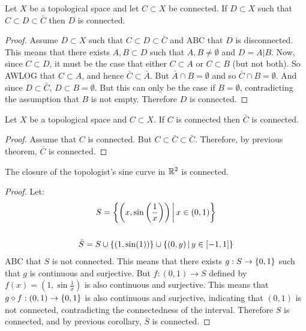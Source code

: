 \documentclass[letterpaper,12pt,fleqn]{article}
\begin{document}
\begin{theorem}[8.6]
  Let \(X\) be a topological space and let \(C\subset X\) be connected.  If \(D\subset X\) such that
  \(C\subset D\subset\bar{C}\) then \(D\) is connected.
\end{theorem}

\begin{proof}
  Assume \(D\subset X\) such that \(C\subset D\subset\bar{C}\) and ABC that \(D\) is disconnected.  This means that
  there exists \(A,B\subset D\) such that \(A,B\ne\emptyset\) and \(D=A|B\).  Now, since \(C\subset D\), it must be
  the case that either \(C\subset A\) or \(C\subset B\) (but not both).  So AWLOG that \(C\subset A\), and hence
  \(\bar{C}\subset\bar{A}\).  But \(\bar{A}\cap B=\emptyset\) and so \(\bar{C}\cap B=\emptyset\).  And since
  \(D\subset\bar{C}\), \(D\subset B=\emptyset\).  But this can only be the case if \(B=\emptyset\), contradicting
  the assumption that \(B\) is not empty.  Therefore \(D\) is connected.
\end{proof}

\begin{corollary}
  Let \(X\) be a topological space and \(C\subset X\).  If \(C\) is connected then \(\bar{C}\) is connected.
\end{corollary}

\begin{proof}
  Assume that \(C\) is connected.  But \(C\subset\bar{C}\subset\bar{C}\).  Therefore, by previous theorem,
  \(\bar{C}\) is connected.
\end{proof}

\begin{theorem}[Exercise 8.7]
  The closure of the topologist's sine curve in \(\mathbb{R}^2\) is connected.
\end{theorem}

\begin{proof}
  Let:
  \begin{gather*}
    S=\left\{{\left(x,\sin\left(\frac{1}{x}\right)\right)}\,\middle|\,{x\in(0,1)}\right\} \\
    \\
    \bar{S}=S\cup\{(1,\sin(1))\}\cup\left\{{(0,y)}\,\middle|\,{y\in[-1,1]}\right\}
  \end{gather*}
  ABC that \(S\) is not connected.  This means that there exists \(g:S\to\{0,1\}\) such that \(g\) is continuous
  and surjective.  But \(f:(0,1)\to S\) defined by \(f(x)=(1,\sin\frac{1}{x})\) is also continuous and surjective.
  This means that \(g\circ f:(0,1)\to\{0,1\}\) is also continuous and surjective, indicating that \((0,1)\)
  is not connected, contradicting the connectedness of the interval.  Therefore \(S\) is connected, and by
  previous corollary, \(\bar{S}\) is connected.
\end{proof}
\end{document}
